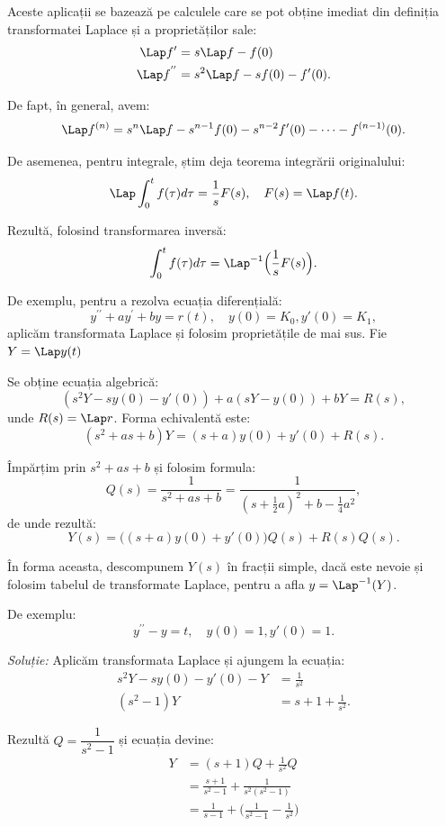 Aceste aplicații se bazează pe calculele care se pot obține imediat din definiția
transformatei Laplace și a proprietăților sale:
\begin{align*}
    \Lap f' &= s \Lap f - f(0) \\
    \Lap f^{''} &= s^2 \Lap f - sf(0) - f'(0).
\end{align*}

De fapt, în general, avem:
\[
    \Lap f^{(n)} = s^n \Lap f - s^{n-1} f(0) - s^{n-2} f'(0) - \dots - f^{(n-1)}(0).
\]

De asemenea, pentru integrale, știm deja teorema integrării originalului:
\[
    \Lap \int_0^t f(\tau) d\tau = \dfrac{1}{s} F(s), \quad F(s) = \Lap f(t).
\]

Rezultă, folosind transformarea inversă:
\[
    \int_0^t f(\tau) d\tau = \Lap^{-1} \Big( \dfrac{1}{s} F(s) \Big).
\]

De exemplu, pentru a rezolva ecuația diferențială:
\[
    y^{\prime \prime} + ay^\prime + by = r(t), \quad y(0) = K_0, y'(0) = K_1,
\]
aplicăm transformata Laplace și folosim proprietățile de mai sus. Fie $ Y = \Lap y(t) $

Se obține ecuația algebrică:
\[
    (s^2 Y - sy(0) - y'(0)) + a(sY - y(0)) + bY = R(s),
\]
unde $ R(s) = \Lap r $. Forma echivalentă este:
\[
    (s^2 + as + b) Y = (s + a)y(0) + y'(0) + R(s).
\]

Împărțim prin $ s^2 + as + b $ și folosim formula:
\[
    Q(s) = \frac{1}{s^2 + as + b} =
    \frac{1}{(s + \frac{1}{2}a)^2 + b - \frac{1}{4}a^2},
\]
de unde rezultă:
\[
    Y(s) = \big( (s + a) y(0) + y'(0)\big) Q(s) + R(s) Q(s).
\]

În forma aceasta, descompunem $ Y(s) $ în fracții simple, dacă este nevoie și
folosim tabelul de transformate Laplace, pentru a afla $ y = \Lap^{-1}(Y) $.

\vspace{0.3cm}

De exemplu:
\[
    y^{\prime\prime} - y = t, \quad y(0) = 1, y'(0) = 1.
\]

\emph{Soluție:} Aplicăm transformata Laplace și ajungem la ecuația:
\begin{align*}
    s^2 Y - sy(0) - y'(0) - Y &= \frac{1}{s^2} \\
    (s^2 - 1)Y &= s + 1 + \frac{1}{s^2}.
\end{align*}

Rezultă $ Q = \dfrac{1}{s^2 - 1} $ și ecuația devine:
\begin{align*}
    Y &= (s + 1)Q + \frac{1}{s^2} Q \\
      &= \frac{s + 1}{s^2 - 1} + \frac{1}{s^2(s^2 - 1)} \\
      &= \frac{1}{s - 1} + \Big( \frac{1}{s^2 - 1} - \frac{1}{s^2} \Big)
\end{align*}

